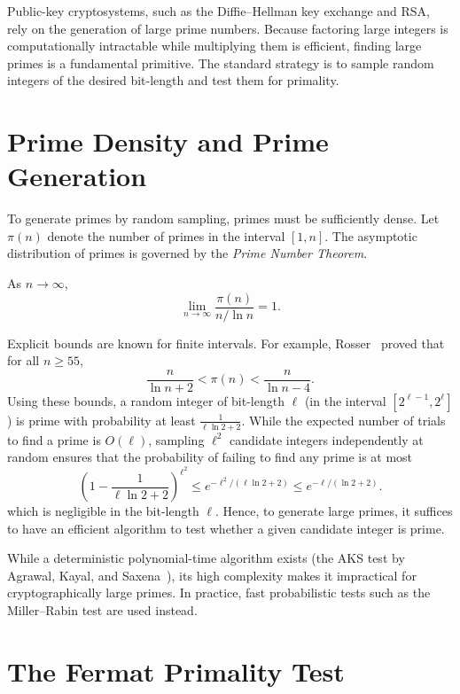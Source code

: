 
Public-key cryptosystems, such as the Diffie--Hellman key exchange and RSA, rely on the generation of large prime numbers.
Because factoring large integers is computationally intractable while multiplying them is efficient, finding large primes is a fundamental primitive.
The standard strategy is to sample random integers of the desired bit-length and test them for primality.

\section*{Prime Density and Prime Generation}

To generate primes by random sampling, primes must be sufficiently dense.
Let \(\pi(n)\) denote the number of primes in the interval \([1, n]\).
The asymptotic distribution of primes is governed by the \emph{Prime Number Theorem}.

\begin{theorem}
    As \(n \to \infty\),
    \[
        \lim_{n \to \infty} \frac{\pi(n)}{n / \ln n} = 1.
    \]
\end{theorem}

Explicit bounds are known for finite intervals. For example, Rosser~\cite{Rosser1941} proved that for all \(n \geq 55\),
\[
    \frac{n}{\ln n + 2} < \pi(n) < \frac{n}{\ln n - 4}.
\]
Using these bounds, a random integer of bit-length \(\ell\) (in the interval \([2^{\ell-1}, 2^\ell]\)) is prime with probability at least \(\frac{1}{\ell \ln 2 + 2}\).
While the expected number of trials to find a prime is \(O(\ell)\), sampling \(\ell^2\) candidate integers independently at random ensures that the probability of failing to find any prime is at most
\[
    \left( 1 - \frac{1}{\ell \ln 2 + 2} \right)^{\ell^2} \leq e^{-\ell^2 / (\ell \ln 2 + 2)} \leq e^{-\ell / (\ln 2 + 2)}.
\]
which is negligible in the bit-length \(\ell\).
Hence, to generate large primes, it suffices to have an efficient algorithm to test whether a given candidate integer is prime.

While a deterministic polynomial-time algorithm exists (the AKS test by Agrawal, Kayal, and Saxena~\cite{AgrawalKayalSaxena2004}), its high complexity makes it impractical for cryptographically large primes.
In practice, fast probabilistic tests such as the Miller--Rabin test are used instead.

\section*{The Fermat Primality Test}

